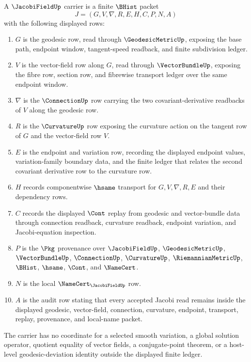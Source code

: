 \begin{definition}
\label{def:jacobi-field-carrier}
A $\JacobiFieldUp$ carrier is a finite $\BHist$ packet
$$
J=(G,V,\nabla,R,E,H,C,P,N,A)
$$
with the following displayed rows:
\begin{enumerate}
\item $G$ is the geodesic row, read through $\GeodesicMetricUp$, exposing the base path, endpoint window, tangent-speed readback, and finite subdivision ledger.
\item $V$ is the vector-field row along $G$, read through $\VectorBundleUp$, exposing the fibre row, section row, and fibrewise transport ledger over the same endpoint window.
\item $\nabla$ is the $\ConnectionUp$ row carrying the two covariant-derivative readbacks of $V$ along the geodesic row.
\item $R$ is the $\CurvatureUp$ row exposing the curvature action on the tangent row of $G$ and the vector-field row $V$.
\item $E$ is the endpoint and variation row, recording the displayed endpoint values, variation-family boundary data, and the finite ledger that relates the second covariant derivative row to the curvature row.
\item $H$ records componentwise $\hsame$ transport for $G,V,\nabla,R,E$ and their dependency rows.
\item $C$ records the displayed $\Cont$ replay from geodesic and vector-bundle data through connection readback, curvature readback, endpoint variation, and Jacobi-equation inspection.
\item $P$ is the $\Pkg$ provenance over $\JacobiFieldUp$, $\GeodesicMetricUp$, $\VectorBundleUp$, $\ConnectionUp$, $\CurvatureUp$, $\RiemannianMetricUp$, $\BHist$, $\hsame$, $\Cont$, and $\NameCert$.
\item $N$ is the local $\NameCert_{\JacobiFieldUp}$ row.
\item $A$ is the audit row stating that every accepted Jacobi read remains inside the displayed geodesic, vector-field, connection, curvature, endpoint, transport, replay, provenance, and local-name packet.
\end{enumerate}
The carrier has no coordinate for a selected smooth variation, a global solution operator, quotient equality of vector fields, a conjugate-point theorem, or a host-level geodesic-deviation identity outside the displayed finite ledger.
\end{definition}

